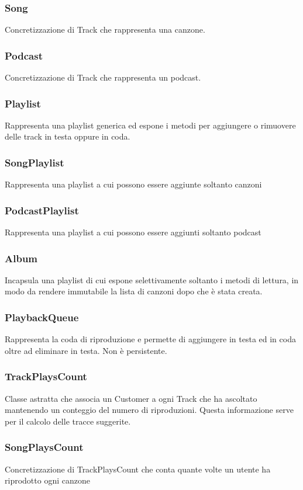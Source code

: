 \documentclass{article}
\begin{document}
  \subsubsection{Song}
  Concretizzazione di Track che rappresenta una canzone.
  \subsubsection{Podcast}
  Concretizzazione di Track che rappresenta un podcast.
  \subsubsection{Playlist}
  Rappresenta una playlist generica ed espone i metodi per aggiungere o rimuovere\\ delle track in testa oppure in coda.

  \subsubsection{SongPlaylist}
  Rappresenta una playlist a cui possono essere aggiunte soltanto canzoni

  \subsubsection{PodcastPlaylist}
  Rappresenta una playlist a cui possono essere aggiunti soltanto podcast
  \subsubsection{Album}
  Incapsula una playlist di cui espone selettivamente soltanto i metodi di lettura, in modo da rendere immutabile la lista di canzoni dopo che è stata creata.
  \subsubsection{PlaybackQueue}
  Rappresenta la coda di riproduzione e permette di aggiungere in testa ed in coda oltre ad eliminare in testa. Non è persistente.

  \subsubsection{TrackPlaysCount}
  Classe astratta che associa un Customer a ogni Track che ha ascoltato mantenendo un conteggio del numero di riproduzioni. Questa informazione serve per il calcolo delle tracce suggerite.

  \subsubsection{SongPlaysCount}
  Concretizzazione di TrackPlaysCount che conta quante volte un utente ha riprodotto ogni canzone
\end{document}
